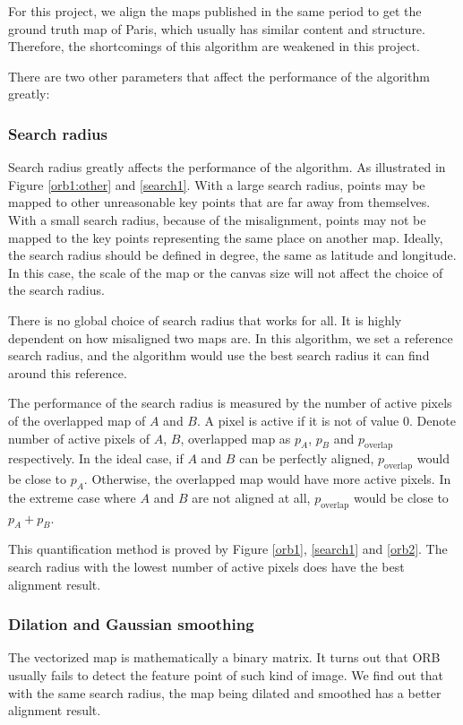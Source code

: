 For this project, we align the maps published in the same period to get the ground truth map of Paris, which usually has similar content and structure. Therefore, the shortcomings of this algorithm are weakened in this project.

There are two other parameters that affect the performance of the algorithm greatly:

\subsubsection{Search radius}

Search radius greatly affects the performance of the algorithm. As illustrated in Figure \ref{orb1:other} and \ref{search1}. With a large search radius, points may be mapped to other unreasonable key points that are far away from themselves. With a small search radius, because of the misalignment, points may not be mapped to the key points representing the same place on another map. Ideally, the search radius should be defined in degree, the same as latitude and longitude. In this case, the scale of the map or the canvas size will not affect the choice of the search radius. 

There is no global choice of search radius that works for all. It is highly dependent on how misaligned two maps are. In this algorithm, we set a reference search radius, and the algorithm would use the best search radius it can find around this reference.

The performance of the search radius is measured by the number of active pixels of the overlapped map of $A$ and $B$. A pixel is active if it is not of value 0. Denote number of active pixels of $A$, $B$, overlapped map as $p_A$, $p_B$ and $p_\text{overlap}$ respectively. In the ideal case, if $A$ and $B$ can be perfectly aligned, $p_\text{overlap}$ would be close to $p_A$. Otherwise, the overlapped map would have more active pixels. In the extreme case where $A$ and $B$ are not aligned at all, $p_\text{overlap}$ would be close to $p_A+p_B$.


This quantification method is proved by Figure \ref{orb1}, \ref{search1} and \ref{orb2}. The search radius with the lowest number of active pixels does have the best alignment result.

\subsubsection{Dilation and Gaussian smoothing}
The vectorized map is mathematically a binary matrix. It turns out that ORB usually fails to detect the feature point of such kind of image. We find out that with the same search radius, the map being dilated and smoothed has a better alignment result.



